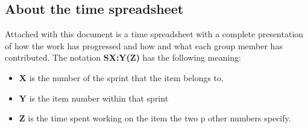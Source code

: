 \documentclass[10pt, a4paper, twoside]{article}
\begin{document}
\subsection{About the time spreadsheet}
Attached with this document is a time spreadsheet with a complete presentation of how the work has progressed and how and what each group member has contributed. The notation \textbf{SX:Y(Z)} has the following meaning:

\begin{itemize}
\item \textbf{X} is the number of the sprint that the item belongs to.
\item \textbf{Y} is the item number within that sprint
\item \textbf{Z} is the time spent working on the item the two p
other numbers specify.
\end{itemize}

%
%
\newpage

\newpage

\newpage

\newpage

\newpage

\end{document}
